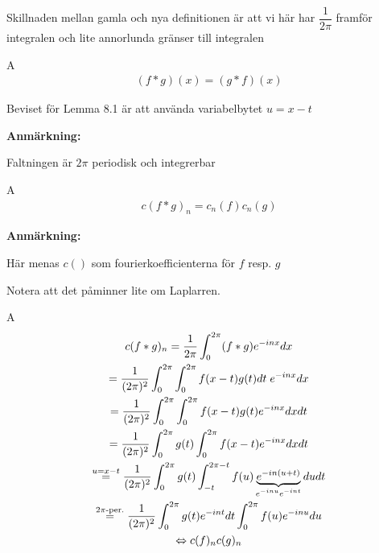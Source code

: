 \par\bigskip
\noindent Skillnaden mellan gamla och nya definitionen är att vi här har $\dfrac{1}{2\pi}$ framför integralen och lite annorlunda gränser till integralen
\par\bigskip
\begin{lem}
  A
  \begin{equation*}
    \begin{gathered}
      (f*g)(x) = (g*f)(x)
    \end{gathered}
  \end{equation*}
\end{lem}
\par\bigskip
\noindent Beviset för Lemma 8.1 är att använda variabelbytet $u = x-t$
\par\bigskip
\noindent\textbf{Anmärkning:}\par
\noindent Faltningen är $2\pi$ periodisk och integrerbar
\par\bigskip
\begin{lem}
  A
  \begin{equation*}
    \begin{gathered}
      c(f*g)_n = c_n(f)c_n(g)
    \end{gathered}
  \end{equation*}
\end{lem}
\par\bigskip
\noindent\textbf{Anmärkning:}\par
\noindent Här menas $c()$ som fourierkoefficienterna för $f$ resp. $g$ \par
\noindent Notera att det påminner lite om Laplarren.
\par\bigskip
\begin{prf}
  A
  \begin{equation*}
    \begin{gathered}
      c(f*g)_n = \dfrac{1}{2\pi}\int_{0}^{2\pi}(f*g)e^{-inx}dx\\
      = \dfrac{1}{(2\pi)^2}\int_{0}^{2\pi}\int_{0}^{2\pi}f(x-t)g(t)dt\;e^{-inx}dx\\
      = \dfrac{1}{(2\pi)^2}\int_{0}^{2\pi}\int_{0}^{2\pi}f(x-t)g(t)e^{-inx}dxdt\\
      =\dfrac{1}{(2\pi)^2}\int_{0}^{2\pi}g(t)\int_{0}^{2\pi}f(x-t)e^{-inx}dxdt\\
      \stackrel{u = x-t}{=}\dfrac{1}{(2\pi)^2}\int_{0}^{2\pi}g(t)\int_{-t}^{2\pi-t}f(u)\underbrace{e^{-in(u+t)}}_{\text{$e^{-inu}e^{-int}$}}dudt\\
      \stackrel{2\pi\text{-per.}}{=}\dfrac{1}{(2\pi)^2}\int_{0}^{2\pi}g(t)e^{-int}dt\int_{0}^{2\pi}f(u)e^{-inu}du\\
      \Leftrightarrow c(f)_nc(g)_n
    \end{gathered}
  \end{equation*}
\end{prf}

